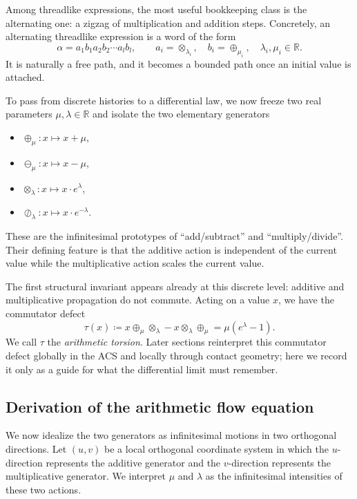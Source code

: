 Among threadlike expressions, the most useful bookkeeping class is the alternating one: a zigzag of multiplication and addition steps. Concretely, an alternating threadlike expression is a word of the form
\begin{equation}\label{eq:flow-alternating}
\alpha = a_1 b_1 a_2 b_2 \cdots a_l b_l,
\qquad
a_i=\otimes_{\lambda_i},\quad b_i=\oplus_{\mu_i},\quad \lambda_i,\mu_i\in\mathbb{R}.
\end{equation}
It is naturally a free path, and it becomes a bounded path once an initial value is attached.

To pass from discrete histories to a differential law, we now freeze two real parameters $\mu,\lambda\in\mathbb{R}$ and isolate the two elementary generators
\begin{itemize}
    \item $\oplus_\mu:x\mapsto x+\mu$,
    \item $\ominus_\mu:x\mapsto x-\mu$,
    \item $\otimes_\lambda:x\mapsto x\cdot e^{\lambda}$,
    \item $\oslash_\lambda:x\mapsto x\cdot e^{-\lambda}$.
\end{itemize}
These are the infinitesimal prototypes of ``add/subtract'' and ``multiply/divide''. Their defining feature is that the additive action is independent of the current value while the multiplicative action scales the current value.

The first structural invariant appears already at this discrete level: additive and multiplicative propagation do not commute. Acting on a value $x$, we have the commutator defect
\begin{equation}\label{eq:flow-torsion}
\tau(x) \coloneqq x\oplus_\mu\otimes_\lambda - x\otimes_\lambda\oplus_\mu
= \mu(e^{\lambda}-1).
\end{equation}
We call $\tau$ the \emph{arithmetic torsion}. Later sections reinterpret this commutator defect globally in the ACS and locally through contact geometry; here we record it only as a guide for what the differential limit must remember.

\subsection{Derivation of the arithmetic flow equation}\label{subsec:flow-derivation}

We now idealize the two generators as infinitesimal motions in two orthogonal directions. Let $(u,v)$ be a local orthogonal coordinate system in which the $u$-direction represents the additive generator and the $v$-direction represents the multiplicative generator. We interpret $\mu$ and $\lambda$ as the infinitesimal intensities of these two actions.

